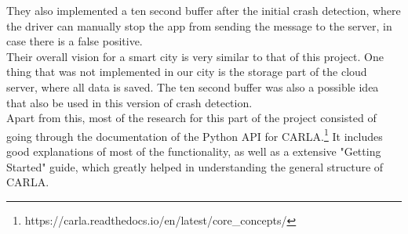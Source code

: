They also implemented a ten second buffer after the initial crash detection,
where the driver can manually stop the app from sending the message to the server,
in case there is a false positive.\cite{iotAccidentSensNRep}
\\
\newline
Their overall vision for a smart city is very similar to that of this project.
One thing that was not implemented in our city is the storage part of the cloud server,
where all data is saved.
The ten second buffer was also a possible idea that also be 
used in this version of crash detection.
\\
\newline
Apart from this, most of the research for this part of the project consisted
of going through the documentation of the Python API for CARLA.\footnote
{https://carla.readthedocs.io/en/latest/core\_concepts/}
It includes good explanations of most of the functionality,
as well as a extensive "Getting Started" guide, 
which greatly helped in understanding the general structure of CARLA.
